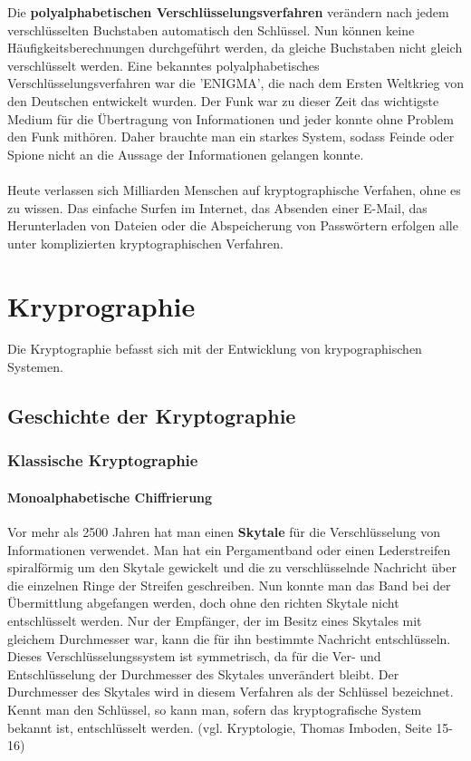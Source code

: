 \documentclass[11pt,a4paper]{report}
\begin{document}
Die \textbf{polyalphabetischen Verschlüsselungsverfahren} verändern nach jedem verschlüsselten Buchstaben automatisch den Schlüssel. Nun können keine Häufigkeitsberechnungen durchgeführt werden, da gleiche Buchstaben nicht gleich verschlüsselt werden. Eine bekanntes polyalphabetisches Verschlüsselungsverfahren war die 'ENIGMA', die nach dem Ersten Weltkrieg von den Deutschen entwickelt wurden. Der Funk war zu dieser Zeit das wichtigste Medium für die Übertragung von Informationen und jeder konnte ohne Problem den Funk mithören. Daher brauchte man ein starkes System, sodass Feinde oder Spione nicht an die Aussage der Informationen gelangen konnte.\\\\

Heute verlassen sich Milliarden Menschen auf kryptographische Verfahen, ohne es zu wissen. Das einfache Surfen im Internet, das Absenden einer E-Mail, das Herunterladen von Dateien oder die Abspeicherung von Passwörtern erfolgen alle unter komplizierten kryptographischen Verfahren.

\section{Kryprographie}

Die Kryptographie befasst sich mit der Entwicklung von krypographischen Systemen.

\subsection{Geschichte der Kryptographie}

\subsubsection{Klassische Kryptographie}

\paragraph{Monoalphabetische Chiffrierung}

Vor mehr als 2500 Jahren hat man einen \textbf{Skytale} für die Verschlüsselung von Informationen verwendet. Man hat ein Pergamentband oder einen Lederstreifen spiralförmig um den Skytale gewickelt und die zu verschlüsselnde Nachricht über die einzelnen Ringe der Streifen geschreiben. Nun konnte man das Band bei der Übermittlung abgefangen werden, doch ohne den richten Skytale nicht entschlüsselt werden. Nur der Empfänger, der im Besitz eines Skytales mit gleichem Durchmesser war, kann die für ihn bestimmte Nachricht entschlüsseln. Dieses Verschlüsselungssystem ist symmetrisch, da für die Ver- und Entschlüsselung der Durchmesser des Skytales unverändert bleibt. Der Durchmesser des Skytales wird in diesem Verfahren als der Schlüssel bezeichnet. Kennt man den Schlüssel, so kann man, sofern das kryptografische System bekannt ist, entschlüsselt werden. (vgl. Kryptologie, Thomas Imboden, Seite 15-16)\\\\
\end{document}
